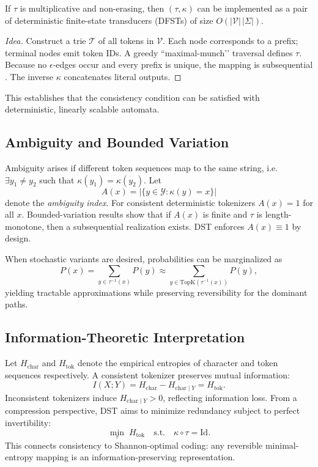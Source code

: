 \begin{proposition}
If $\tau$ is multiplicative and non-erasing,
then $(\tau,\kappa)$ can be implemented as
a pair of deterministic finite-state transducers (DFSTs)
of size $O(|\mathcal{V}|\,|\Sigma|)$.
\end{proposition}

\begin{proof}[Idea]
Construct a trie $\mathcal{T}$ of all tokens in $\mathcal{V}$.
Each node corresponds to a prefix; terminal nodes emit token IDs.
A greedy “maximal-munch’’ traversal defines $\tau$.
Because no $\epsilon$-edges occur and every prefix is unique,
the mapping is subsequential \citep{choffrut1979sequential}.
The inverse $\kappa$ concatenates literal outputs.
\end{proof}

This establishes that the consistency condition
can be satisfied with deterministic, linearly scalable automata.

\subsection{Ambiguity and Bounded Variation}

Ambiguity arises if different token sequences map to the same string,
i.e.\ $\exists y_1\ne y_2$ such that $\kappa(y_1)=\kappa(y_2)$.
Let
\[
A(x)=|\{y\in\mathcal{Y}:\kappa(y)=x\}|
\]
denote the \emph{ambiguity index}.
For consistent deterministic tokenizers $A(x)=1$ for all $x$.
Bounded-variation results \citep{mohri1997finite}
show that if $A(x)$ is finite and $\tau$ is length-monotone,
then a subsequential realization exists.
DST enforces $A(x)\!\equiv\!1$ by design.

When stochastic variants are desired,
probabilities can be marginalized as
\[
P(x)=\sum_{y\in\tau^{-1}(x)}P(y)
\approx\sum_{y\in\mathrm{TopK}(\tau^{-1}(x))}P(y),
\]
yielding tractable approximations while preserving reversibility
for the dominant paths.

\subsection{Information-Theoretic Interpretation}

Let $H_{\text{char}}$ and $H_{\text{tok}}$
denote the empirical entropies of character
and token sequences respectively.
A consistent tokenizer preserves mutual information:
\[
I(X;Y)=H_{\text{char}}-H_{\text{char}\mid Y}=H_{\text{tok}}.
\]
Inconsistent tokenizers induce
$H_{\text{char}\mid Y}>0$,
reflecting information loss.
From a compression perspective,
DST aims to minimize redundancy
subject to perfect invertibility:
\[
\min_{\tau}\; H_{\text{tok}} \quad
\text{s.t.}\quad \kappa\!\circ\!\tau = \mathrm{Id}.
\]
This connects consistency to Shannon-optimal coding:
any reversible minimal-entropy mapping is
an information-preserving representation.

